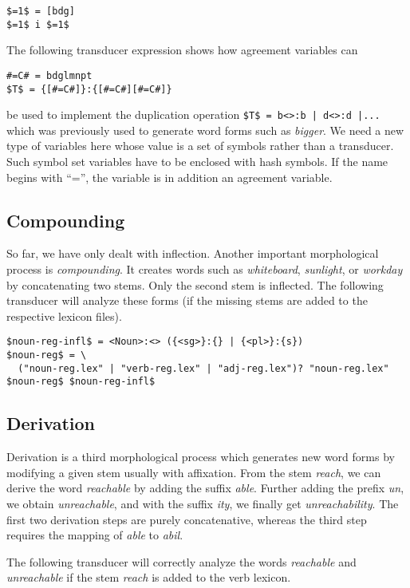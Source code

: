 \documentclass[11pt]{article}
\begin{document}
\begin{verbatim}
$=1$ = [bdg]
$=1$ i $=1$
\end{verbatim}

The following transducer expression shows how agreement variables can
\begin{verbatim}
#=C# = bdglmnpt
$T$ = {[#=C#]}:{[#=C#][#=C#]}
\end{verbatim}
be used to implement the duplication operation
\verb#$T$ = b<>:b | d<>:d |...# which was previously used to generate
word forms such as \emph{bigger}. We need a new type of variables here
whose value is a set of symbols rather than a transducer. Such symbol
set variables have to be enclosed with hash symbols. If the name
begins with ``='', the variable is in addition an agreement variable.


\subsection{Compounding}

So far, we have only dealt with inflection. Another important
morphological process is \emph{compounding}. It creates words such as
\emph{whiteboard}, \emph{sunlight}, or \emph{workday} by concatenating
two stems. Only the second stem is inflected. The following transducer
will analyze these forms (if the missing stems are added to the
respective lexicon files).

\begin{verbatim}
$noun-reg-infl$ = <Noun>:<> ({<sg>}:{} | {<pl>}:{s})
$noun-reg$ = \
  ("noun-reg.lex" | "verb-reg.lex" | "adj-reg.lex")? "noun-reg.lex"
$noun-reg$ $noun-reg-infl$
\end{verbatim}


\subsection{Derivation}

Derivation is a third morphological process which generates new word
forms by modifying a given stem usually with affixation. From the stem
\emph{reach}, we can derive the word \emph{reachable} by adding the
suffix \emph{able}. Further adding the prefix \emph{un}, we obtain
\emph{unreachable}, and with the suffix \emph{ity}, we finally get
\emph{unreachability}. The first two derivation steps are purely
concatenative, whereas the third step requires the mapping of
\emph{able} to \emph{abil}.

The following transducer will correctly analyze the words
\emph{reachable} and \emph{unreachable} if the stem \emph{reach} is
added to the verb lexicon.
\end{document}
